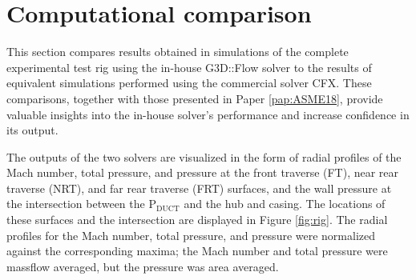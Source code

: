 
\section{Computational comparison}
This section compares results obtained in simulations of the complete experimental test rig using the in-house G3D::Flow solver to the results of equivalent simulations performed using the commercial solver CFX. These comparisons, together with those presented in Paper \ref{pap:ASME18}, provide valuable insights into the in-house solver's performance and increase confidence in its output.

The outputs of the two solvers are visualized in the form of radial profiles of the Mach number, total pressure, and pressure at the front traverse (FT), near rear traverse (NRT), and far rear traverse (FRT) surfaces, and the wall pressure at the intersection between the P$_\text{DUCT}$ and the hub and casing. The locations of these surfaces and the intersection are displayed in Figure \ref{fig:rig}. The radial profiles for the Mach number, total pressure, and pressure were normalized against the corresponding maxima; the Mach number and total pressure were massflow averaged, but the pressure was area averaged. 

